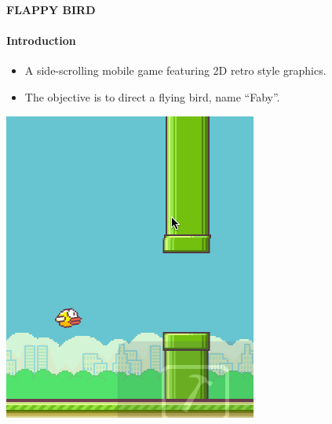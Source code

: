 \documentclass[10pt]{beamer}
\begin{document}
{
%
\begin{frame}{\textbf{FLAPPY BIRD}}
    \framesubtitle{\textbf{Introduction}}
\begin{itemize}
\item A side-scrolling mobile game featuring 2D retro style graphics.
\pause 
\item The objective is to direct a flying bird, name “Faby”.
\end{itemize}
\vspace{1cm}
\pause
\includegraphics[scale=0.35]{pipes2.png}
\end{frame}
}
\end{document}
